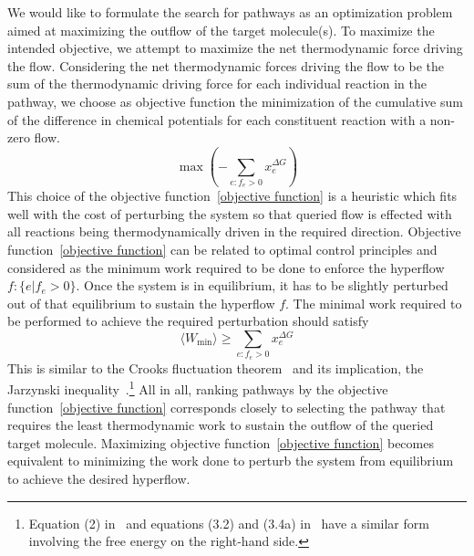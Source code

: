 We would like to formulate the search for pathways as an optimization problem aimed at maximizing the outflow of the target molecule(s).
To maximize the intended objective, we attempt to maximize the net thermodynamic force driving the flow.
Considering the net thermodynamic forces driving the flow to be the sum of the thermodynamic driving force for each individual reaction in the pathway,
we choose as objective function the minimization of the cumulative sum of the difference in chemical potentials for each constituent reaction with a non-zero flow. 
\begin{equation}
    \max \left(- \sum_{e\colon f_e > 0} x^{\Delta G}_e \right)
    \label{objective function}
\end{equation}
This choice of the objective function~\eqref{objective function} is a heuristic which fits  well with the cost of perturbing the system so that queried flow is effected with all reactions being thermodynamically driven in the required direction. 
Objective function~\eqref{objective function} can be related to optimal control principles and considered as the minimum work required to be done to enforce the hyperflow $f: \{e | f_e > 0\}$. Once the system is in equilibrium, it has to be slightly perturbed out of that equilibrium to sustain the hyperflow $f$.
The minimal work required to be performed to achieve the required perturbation should satisfy
\begin{equation*}
	\langle W_{\text{min}} \rangle \geq \sum_{e\colon f_e > 0} x^{\Delta G}_e
\end{equation*}
This is similar to the Crooks fluctuation theorem~\cite{crooks,crooks2} and its implication, the Jarzynski inequality~\cite{jarzynski,jarzynski2,jarzynski3}.\footnote{Equation (2) in~\cite{jarzynski} and equations (3.2) and (3.4a) in~\cite{jarzynski2} have a similar form involving the free energy on the right-hand side.}
All in all, ranking pathways by the objective function~\eqref{objective function} corresponds closely to selecting the pathway that requires the least thermodynamic work to sustain the outflow of the queried target molecule. Maximizing objective function~\eqref{objective function} becomes equivalent to minimizing the work done to perturb the system from equilibrium to achieve the desired hyperflow. 

